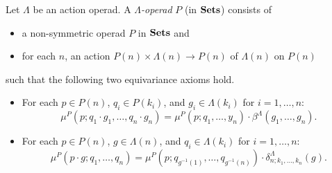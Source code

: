 

\begin{Defi}\label{Defi:lamop}
  Let $\Lambda$ be an action operad. A \textit{$\Lambda$-operad} $P$ (in $\mathbf{Sets}$) consists of
    \begin{itemize}
      \item a non-symmetric operad $P$ in $\mathbf{Sets}$ and
      \item for each $n$, an action $P(n) \times \Lambda(n) \rightarrow P(n)$ of $\Lambda(n)$ on $P(n)$
    \end{itemize}
such that the following two equivariance axioms hold.
  \begin{itemize}
    \item For each $p \in P(n)$, $q_i \in P(k_i)$, and $g_i \in \Lambda(k_i)$ for $i=1, \ldots, n$:
  \[
    \mu^{P}(p; q_{1} \cdot g_{1}, \ldots, q_{n} \cdot g_{n}) = \mu^{P}(p; q_{1}, \ldots, y_{n}) \cdot \beta^{\Lambda}(g_{1}, \ldots, g_{n}).
  \]
    \item For each $p \in P(n)$, $g \in \Lambda(n)$, and $q_i \in \Lambda(k_i)$ for $i=1, \ldots, n$:
  \[
    \mu^{P}(p \cdot g; q_{1}, \ldots, q_{n}) = \mu^{P}\left(p; q_{g^{-1}(1)}, \ldots, q_{g^{-1}(n)}\right) \cdot \delta_{n;k_1,\ldots,k_n}^{\Lambda}(g).
  \]
  \end{itemize}
\end{Defi}

